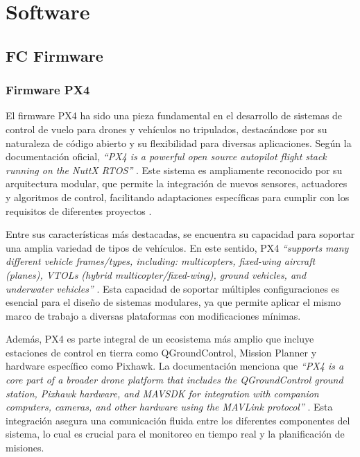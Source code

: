 
\section{Software}

\subsection{FC Firmware}
    \subsubsection{Firmware PX4}
    El firmware PX4 ha sido una pieza fundamental en el desarrollo de sistemas de control de vuelo para drones y vehículos no tripulados, destacándose por su naturaleza de código abierto y su flexibilidad para diversas aplicaciones. Según la documentación oficial, \textit{``PX4 is a powerful open source autopilot flight stack running on the NuttX RTOS''} \cite{px4_docs}. Este sistema es ampliamente reconocido por su arquitectura modular, que permite la integración de nuevos sensores, actuadores y algoritmos de control, facilitando adaptaciones específicas para cumplir con los requisitos de diferentes proyectos \cite{px4_docs}.

    Entre sus características más destacadas, se encuentra su capacidad para soportar una amplia variedad de tipos de vehículos. En este sentido, PX4 \textit{``supports many different vehicle frames/types, including: multicopters, fixed-wing aircraft (planes), VTOLs (hybrid multicopter/fixed-wing), ground vehicles, and underwater vehicles''} \cite{px4_docs}. Esta capacidad de soportar múltiples configuraciones es esencial para el diseño de sistemas modulares, ya que permite aplicar el mismo marco de trabajo a diversas plataformas con modificaciones mínimas.

    Además, PX4 es parte integral de un ecosistema más amplio que incluye estaciones de control en tierra como QGroundControl, Mission Planner y hardware específico como Pixhawk. La documentación menciona que \textit{``PX4 is a core part of a broader drone platform that includes the QGroundControl ground station, Pixhawk hardware, and MAVSDK for integration with companion computers, cameras, and other hardware using the MAVLink protocol''} \cite{px4_docs}. Esta integración asegura una comunicación fluida entre los diferentes componentes del sistema, lo cual es crucial para el monitoreo en tiempo real y la planificación de misiones.

